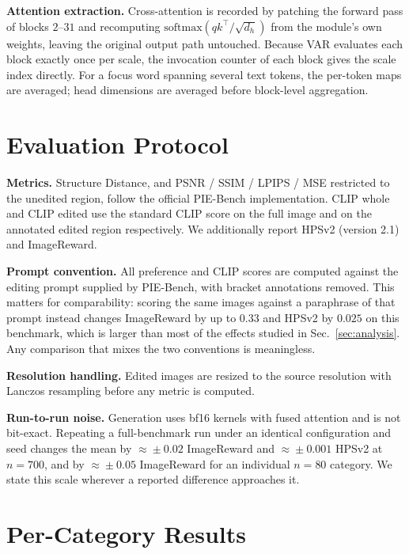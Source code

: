 \noindent\textbf{Attention extraction.}
Cross-attention is recorded by patching the forward pass of blocks $2$--$31$ and
recomputing $\mathrm{softmax}(qk^{\top}/\sqrt{d_h})$ from the module's own
weights, leaving the original output path untouched. Because VAR evaluates each
block exactly once per scale, the invocation counter of each block gives the
scale index directly. For a focus word spanning several text tokens, the
per-token maps are averaged; head dimensions are averaged before block-level
aggregation.


\section{Evaluation Protocol}
\label{app:eval}

\noindent\textbf{Metrics.}
Structure Distance, and PSNR / SSIM / LPIPS / MSE restricted to the unedited
region, follow the official PIE-Bench implementation. CLIP whole and CLIP edited
use the standard CLIP score on the full image and on the annotated edited region
respectively. We additionally report HPSv2 (version 2.1) and ImageReward.

\noindent\textbf{Prompt convention.}
All preference and CLIP scores are computed against the editing prompt supplied
by PIE-Bench, with bracket annotations removed. This matters for comparability:
scoring the same images against a paraphrase of that prompt instead changes
ImageReward by up to $0.33$ and HPSv2 by $0.025$ on this benchmark, which is
larger than most of the effects studied in Sec.~\ref{sec:analysis}. Any
comparison that mixes the two conventions is meaningless.

\noindent\textbf{Resolution handling.}
Edited images are resized to the source resolution with Lanczos resampling before
any metric is computed.

\noindent\textbf{Run-to-run noise.}
Generation uses bf16 kernels with fused attention and is not bit-exact. Repeating
a full-benchmark run under an identical configuration and seed changes the mean
by $\approx\!\pm 0.02$ ImageReward and $\approx\!\pm 0.001$ HPSv2 at $n{=}700$,
and by $\approx\!\pm 0.05$ ImageReward for an individual $n{=}80$ category. We
state this scale wherever a reported difference approaches it.

\section{Per-Category Results}
\label{app:category}

